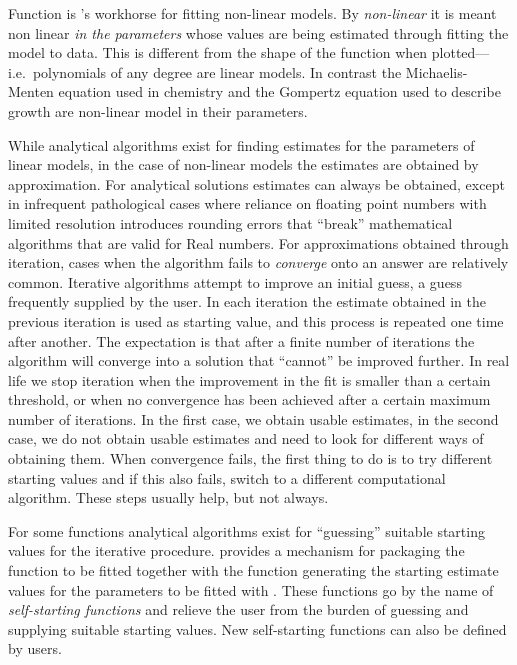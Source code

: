 \documentclass[krantz2]{krantz}\usepackage{knitr}%
\begin{document}
Function  is \Rlang's workhorse for fitting non-linear models. By \emph{non-linear} it is meant non linear \emph{in the parameters} whose values are being estimated through fitting the model to data. This is different from the shape of the function when plotted---i.e.\ polynomials of any degree are linear models. In contrast the Michaelis-Menten equation used in chemistry and the  Gompertz equation used to describe growth are non-linear model in their parameters.

While analytical algorithms exist for finding estimates for the parameters of linear models, in the case of non-linear models the estimates are obtained by approximation. For analytical solutions estimates can always be obtained, except in infrequent pathological cases where reliance on floating point numbers with limited resolution introduces rounding errors that ``break'' mathematical algorithms that are valid for Real numbers. For approximations obtained through iteration, cases when the algorithm fails to \emph{converge} onto an answer are relatively common. Iterative algorithms attempt to improve an initial guess, a guess frequently supplied by the user. In each iteration the estimate obtained in the previous iteration is used as starting value, and this process is repeated one time after another. The expectation is that after a finite number of iterations the algorithm will converge into a solution that ``cannot'' be improved further. In real life we stop iteration when the improvement in the fit is smaller than a certain threshold, or when no convergence has been achieved after a certain maximum number of iterations. In the first case, we obtain usable estimates, in the second case, we do not obtain usable estimates and need to look for different ways of obtaining them. When convergence fails, the first thing to do is to try different starting values and if this also fails, switch to a different computational algorithm. These steps usually help, but not always.

For some functions analytical algorithms exist for ``guessing'' suitable starting values for the iterative procedure. \Rlang provides a mechanism for packaging the function to be fitted together with the function generating the starting estimate values for the parameters to be fitted with . These functions go by the name of \emph{self-starting functions} and relieve the user from the burden of guessing and supplying suitable starting values. New self-starting functions can also be defined by users.
\end{document}
